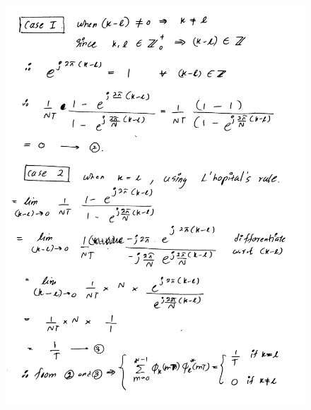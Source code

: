 \documentclass[a4paper,11pt]{article}%
\begin{document}
\begin{figure}[!h]
	\includegraphics[scale=0.22]{figures/img5}
\end{figure}
\end{document}
